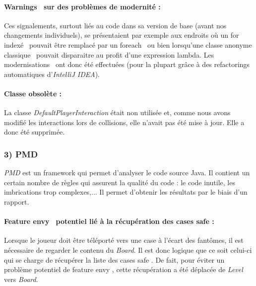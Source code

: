 \documentclass[12pt, openany]{report}
\begin{document}
\paragraph{\og Warnings \fg \ sur des \og problèmes de modernité \fg : }
Ces signalements, surtout liés au code dans sa version de base (avant nos changements individuels), se présentaient par exemple aux endroits où un \og for indexé \fg \, pouvait être remplacé par un \og foreach \fg \, ou bien lorsqu'une classe anonyme \og classique \fg \, pouvait disparaitre au profit d'une expression lambda. Les \og modernisations \fg \, ont donc été effectuées (pour la plupart grâce à des \og refactorings \fg \, automatiques d'\textit{IntelliJ IDEA}).

\paragraph{Classe obsolète : }
La classe \mbox{\textit{DefaultPlayerInteraction}} était non utilisée et, comme nous avons modifié les interactions lors de collisions, elle n'avait pas été mise à jour.
Elle a donc été supprimée.

\subsubsection*{3) PMD}

\textit{PMD} est un framework qui permet d'analyser le code source Java. Il contient un certain nombre de règles qui assurent la qualité du code : le code inutile, les imbrications trop complexes,... Il permet d'obtenir les résultats par le biais d'un rapport.

\paragraph{\og Feature envy \fg \, potentiel lié à la récupération des cases \og safe \fg : }
Lorsque le joueur doit être téléporté vers une case à l'écart des fantômes, il est nécessaire de regarder le contenu du \textit{Board}. Il est donc logique que ce soit celui-ci qui se charge de récupérer la liste des cases \og safe \fg . De fait, pour éviter un problème potentiel de \og feature envy \fg , cette récupération a été déplacée de \textit{Level} vers \textit{Board}.
\end{document}
